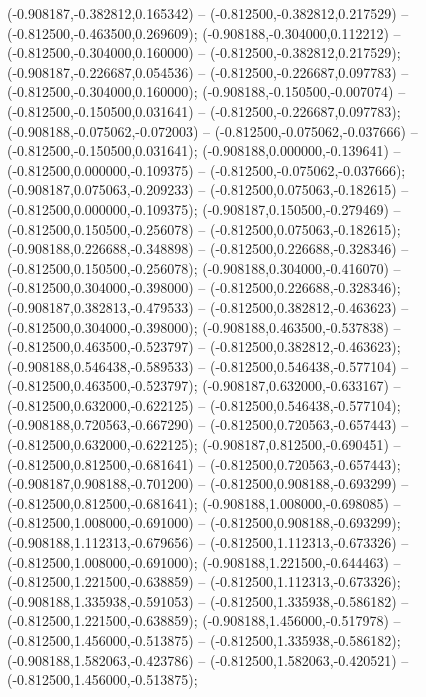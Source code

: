  (-0.908187,-0.382812,0.165342) -- (-0.812500,-0.382812,0.217529) -- (-0.812500,-0.463500,0.269609);
 (-0.908188,-0.304000,0.112212) -- (-0.812500,-0.304000,0.160000) -- (-0.812500,-0.382812,0.217529);
 (-0.908187,-0.226687,0.054536) -- (-0.812500,-0.226687,0.097783) -- (-0.812500,-0.304000,0.160000);
 (-0.908188,-0.150500,-0.007074) -- (-0.812500,-0.150500,0.031641) -- (-0.812500,-0.226687,0.097783);
 (-0.908188,-0.075062,-0.072003) -- (-0.812500,-0.075062,-0.037666) -- (-0.812500,-0.150500,0.031641);
 (-0.908188,0.000000,-0.139641) -- (-0.812500,0.000000,-0.109375) -- (-0.812500,-0.075062,-0.037666);
 (-0.908187,0.075063,-0.209233) -- (-0.812500,0.075063,-0.182615) -- (-0.812500,0.000000,-0.109375);
 (-0.908187,0.150500,-0.279469) -- (-0.812500,0.150500,-0.256078) -- (-0.812500,0.075063,-0.182615);
 (-0.908188,0.226688,-0.348898) -- (-0.812500,0.226688,-0.328346) -- (-0.812500,0.150500,-0.256078);
 (-0.908188,0.304000,-0.416070) -- (-0.812500,0.304000,-0.398000) -- (-0.812500,0.226688,-0.328346);
 (-0.908187,0.382813,-0.479533) -- (-0.812500,0.382812,-0.463623) -- (-0.812500,0.304000,-0.398000);
 (-0.908188,0.463500,-0.537838) -- (-0.812500,0.463500,-0.523797) -- (-0.812500,0.382812,-0.463623);
 (-0.908188,0.546438,-0.589533) -- (-0.812500,0.546438,-0.577104) -- (-0.812500,0.463500,-0.523797);
 (-0.908187,0.632000,-0.633167) -- (-0.812500,0.632000,-0.622125) -- (-0.812500,0.546438,-0.577104);
 (-0.908188,0.720563,-0.667290) -- (-0.812500,0.720563,-0.657443) -- (-0.812500,0.632000,-0.622125);
 (-0.908187,0.812500,-0.690451) -- (-0.812500,0.812500,-0.681641) -- (-0.812500,0.720563,-0.657443);
 (-0.908187,0.908188,-0.701200) -- (-0.812500,0.908188,-0.693299) -- (-0.812500,0.812500,-0.681641);
 (-0.908188,1.008000,-0.698085) -- (-0.812500,1.008000,-0.691000) -- (-0.812500,0.908188,-0.693299);
 (-0.908188,1.112313,-0.679656) -- (-0.812500,1.112313,-0.673326) -- (-0.812500,1.008000,-0.691000);
 (-0.908188,1.221500,-0.644463) -- (-0.812500,1.221500,-0.638859) -- (-0.812500,1.112313,-0.673326);
 (-0.908188,1.335938,-0.591053) -- (-0.812500,1.335938,-0.586182) -- (-0.812500,1.221500,-0.638859);
 (-0.908188,1.456000,-0.517978) -- (-0.812500,1.456000,-0.513875) -- (-0.812500,1.335938,-0.586182);
 (-0.908188,1.582063,-0.423786) -- (-0.812500,1.582063,-0.420521) -- (-0.812500,1.456000,-0.513875);
